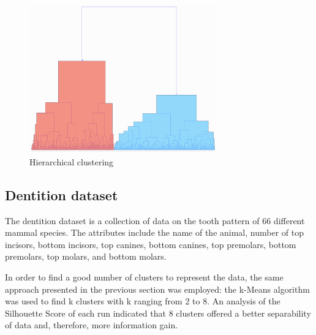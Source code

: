 \documentclass{article}
\begin{document}
\begin{figure}[htbp]
    \centering
    \includegraphics[width=8.1cm]{hierarchical.png}
    \caption{Hierarchical clustering}
    \label{fig:hierarchical}
\end{figure}

\subsection*{Dentition dataset}

The dentition dataset is a collection of data on the tooth pattern of 66 different mammal species. The attributes include the name of the animal, number of top incisors, bottom incisors, top canines, bottom canines, top premolars, bottom premolars, top molars, and bottom molars.

In order to find a good number of clusters to represent the data,  the same approach presented in the previous section was employed: the k-Means algorithm was used to find k clusters with k ranging from 2 to 8. An analysis of the Silhouette Score of each run indicated that 8 clusters offered a better separability of data and, therefore, more information gain.
\end{document}

